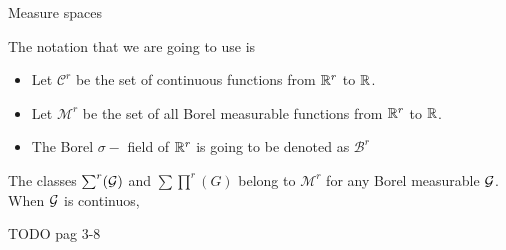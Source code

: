 \begin{definition} Measure spaces \cite{rudin-lebesgue-theory}

     
\end{definition}


The notation that we are going to use is

\begin{definition}
    \begin{itemize}
        \item Let $\mathcal C^r$ be the set of continuous functions from $\mathbb{R}^r$ to $\mathbb{R}$.
        \item Let $\mathcal{M}^r$ be the set of all Borel measurable functions from $\mathbb{R}^r$ to $\mathbb{R}$.
        \item The Borel $\sigma -$ field of $\mathbb{R}^r$ is going to be denoted as $\mathcal B^r$
    \end{itemize}
\end{definition}  

The classes $\sum ^r (\mathcal{G})$ and $\sum \prod ^r (G)$ belong to $\mathcal{M}^r$ 
for any Borel measurable $\mathcal{G}$. When $\mathcal{G}$ is continuos, 

TODO pag 3-8  

\medskip

\printbibliography

